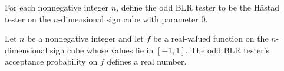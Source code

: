 \begin{definition}
\label{FABL.oddBLRTester}
\leanok
{}
For each nonnegative integer $n$, define the odd BLR tester to be the Håstad tester on
the $n$-dimensional sign cube with parameter $0$.
\end{definition}

\begin{definition}
\label{FABL.oddBLRAcceptanceProbability}
\leanok
{}
Let $n$ be a nonnegative integer and let $f$ be a real-valued function on the
$n$-dimensional sign cube whose values lie in $[-1,1]$. The odd BLR tester's acceptance
probability on $f$ defines a real number.
\end{definition}

